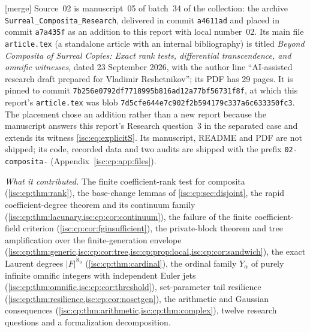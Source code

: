 \documentclass[11pt,letterpaper]{article}
\theoremstyle{definition}
\theoremstyle{remark}
\newcommand{\mtag}{\textup{[merge]}}%
\numberwithin{equation}{section}
\begin{document}
\mtag{} Source~02 is manuscript~05 of batch~34 of the collection: the
archive \nolinkurl{Surreal_Composita_Research}, delivered in commit
\texttt{a4611ad} and placed in commit \texttt{a7a435f} as an addition to
this report with local number~02. Its main file \texttt{article.tex} (a
standalone article with an internal bibliography) is titled \emph{Beyond
Composita of Surreal Copies: Exact rank tests, differential transcendence,
and omnific witnesses}, dated 23 September 2026, with the author line
``AI-assisted research draft prepared for Vladimir Reshetnikov''; its PDF
has 29 pages. It is pinned to commit
\nolinkurl{7b256e0792df7718995b816ad12a77bf56731f8f}, at which this report's
\texttt{article.tex} was blob \nolinkurl{7d5cfe644e7c902f2b594179c337a6c633350fc3}.
The placement chose an addition rather than a new report because the
manuscript answers this report's Research question~3 in the separated case
and extends its witness \eqref{isc:eq:explicitS}. Its manuscript, README and
PDF are not shipped; its code, recorded data and two audits are shipped with
the prefix \texttt{02-composita-} (Appendix~\ref{isc:cp:app:files}).

\emph{What it contributed.} The finite coefficient-rank test for composita
(\cref{isc:cp:thm:rank}), the base-change lemmas of
\cref{isc:cp:sec:disjoint}, the rapid coefficient-degree theorem and its
continuum family (\cref{isc:cp:thm:lacunary,isc:cp:cor:continuum}), the
failure of the finite coefficient-field criterion
(\cref{isc:cp:cor:fginsufficient}), the private-block theorem and tree
amplification over the finite-generation envelope
(\cref{isc:cp:thm:generic,isc:cp:cor:tree,isc:cp:prop:local,isc:cp:cor:sandwich}),
the exact Laurent degrees $|F|^{\aleph_0}$ (\cref{isc:cp:thm:cardinal}), the
ordinal family $Y_\alpha$ of purely infinite omnific integers with
independent Euler jets (\cref{isc:cp:thm:omnific,isc:cp:cor:threshold}),
set-parameter tail resilience (\cref{isc:cp:thm:resilience,isc:cp:cor:nosetgen}),
the arithmetic and Gaussian consequences
(\cref{isc:cp:thm:arithmetic,isc:cp:thm:complex}), twelve research questions
and a formalization decomposition.
\end{document}
